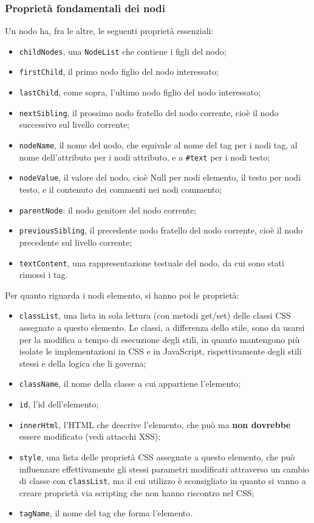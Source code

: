 \documentclass[a4paper,11pt]{article}
\begin{document}
\subsubsection{Proprietà fondamentali dei nodi}
Un nodo ha, fra le altre, le seguenti proprietà essenziali:
\begin{itemize}
	\item \lstinline|childNodes|, una \lstinline|NodeList| che contiene i figli del nodo;
	\item \lstinline|firstChild|, il primo nodo figlio del nodo interessato;
	\item \lstinline|lastChild|, come sopra, l'ultimo nodo figlio del nodo interessato;
	\item \lstinline|nextSibling|, il prossimo nodo fratello del nodo corrente, cioè il nodo successivo sul livello corrente;
	\item \lstinline|nodeName|, il nome del nodo, che equivale al nome del tag per i nodi tag, al nome dell'attributo per i nodi attributo, e a \lstinline|#text| per i nodi testo;
	\item \lstinline|nodeValue|, il valore del nodo, cioè Null per nodi elemento, il testo per nodi testo, e il contenuto dei commenti nei nodi commento;
	\item \lstinline|parentNode|: il nodo genitore del nodo corrente;
	\item \lstinline|previousSibling|, il precedente nodo fratello del nodo corrente, cioè il nodo precedente sul livello corrente;
 	\item \lstinline|textContent|, una rappresentazione testuale del nodo, da cui sono stati rimossi i tag.
\end{itemize}

Per quanto riguarda i nodi elemento, si hanno poi le proprietà:
\begin{itemize}
	\item \lstinline|classList|, una lista in sola lettura (con metodi get/set) delle classi CSS assegnate a questo elemento. Le classi, a differenza dello stile, sono da usarsi per la modifica a tempo di esecuzione degli stili, in quanto mantengono più isolate le implementazioni in CSS e in JavaScript, rispettivamente degli stili stessi e della logica che li governa;
	\item \lstinline|className|, il nome della classe a cui appartiene l'elemento;
	\item \lstinline|id|, l'id dell'elemento;
	\item \lstinline|innerHtml|, l'HTML che descrive l'elemento, che può ma \textbf{non dovrebbe} essere modificato (vedi attacchi XSS);
	\item \lstinline|style|, una lista delle proprietà CSS assegnate a questo elemento, che può influenzare effettivamente gli stessi parametri modificati attraverso un cambio di classe con \lstinline|classList|, ma il cui utilizzo è sconsigliato in quanto si vanno a creare proprietà via scripting che non hanno riscontro nel CSS;
	\item \lstinline|tagName|, il nome del tag che forma l'elemento.
\end{itemize}
\end{document}

